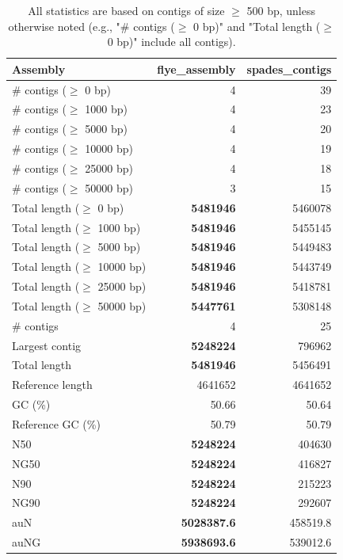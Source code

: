 \documentclass[12pt,a4paper]{article}
\begin{document}
\begin{table}[ht]
\begin{center}
\caption{All statistics are based on contigs of size $\geq$ 500 bp, unless otherwise noted (e.g., "\# contigs ($\geq$ 0 bp)" and "Total length ($\geq$ 0 bp)" include all contigs).}
\begin{tabular}{|l*{2}{|r}|}
\hline
Assembly & flye\_assembly & spades\_contigs \\ \hline
\# contigs ($\geq$ 0 bp) & 4 & 39 \\ \hline
\# contigs ($\geq$ 1000 bp) & 4 & 23 \\ \hline
\# contigs ($\geq$ 5000 bp) & 4 & 20 \\ \hline
\# contigs ($\geq$ 10000 bp) & 4 & 19 \\ \hline
\# contigs ($\geq$ 25000 bp) & 4 & 18 \\ \hline
\# contigs ($\geq$ 50000 bp) & 3 & 15 \\ \hline
Total length ($\geq$ 0 bp) & {\bf 5481946} & 5460078 \\ \hline
Total length ($\geq$ 1000 bp) & {\bf 5481946} & 5455145 \\ \hline
Total length ($\geq$ 5000 bp) & {\bf 5481946} & 5449483 \\ \hline
Total length ($\geq$ 10000 bp) & {\bf 5481946} & 5443749 \\ \hline
Total length ($\geq$ 25000 bp) & {\bf 5481946} & 5418781 \\ \hline
Total length ($\geq$ 50000 bp) & {\bf 5447761} & 5308148 \\ \hline
\# contigs & 4 & 25 \\ \hline
Largest contig & {\bf 5248224} & 796962 \\ \hline
Total length & {\bf 5481946} & 5456491 \\ \hline
Reference length & 4641652 & 4641652 \\ \hline
GC (\%) & 50.66 & 50.64 \\ \hline
Reference GC (\%) & 50.79 & 50.79 \\ \hline
N50 & {\bf 5248224} & 404630 \\ \hline
NG50 & {\bf 5248224} & 416827 \\ \hline
N90 & {\bf 5248224} & 215223 \\ \hline
NG90 & {\bf 5248224} & 292607 \\ \hline
auN & {\bf 5028387.6} & 458519.8 \\ \hline
auNG & {\bf 5938693.6} & 539012.6 \\ \hline

\end{tabular}
\end{center}
\end{table}
\end{document}
